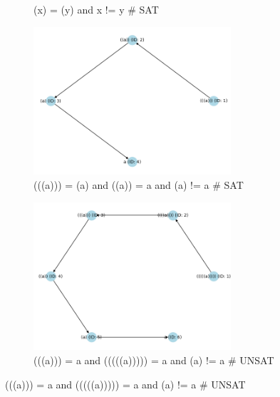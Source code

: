 \documentclass[11pt]{report}
\begin{document}
\begin{figure}[h]
\begin{subfigure}{0.5\textwidth}
        \caption*{(x) = (y) and x != y \color{ForestGreen}\# SAT}
        \label{fig:subim3}
        \end{subfigure}
    \begin{subfigure}{0.5\textwidth}
        \includegraphics[width=0.9\linewidth, height=5.5cm]{graph/(((a))) = (a) and ((a)) = a and (a) != a.png}
        \caption*{(((a))) = (a) and ((a)) = a and (a) != a \color{ForestGreen}\# SAT}
        \label{fig:subim4}
        \end{subfigure}
    \begin{subfigure}{0.5\textwidth}
        \includegraphics[width=0.9\linewidth, height=5.5cm]{graph/(((a))) = a and (((((a))))) = a and (a) != a.png}
        \caption*{(((a))) = a and (((((a))))) = a and (a) != a \color{red}\# UNSAT}
        \label{fig:subim5}
        \end{subfigure}
    \label{fig:image2}
    \end{figure}
\end{document}
